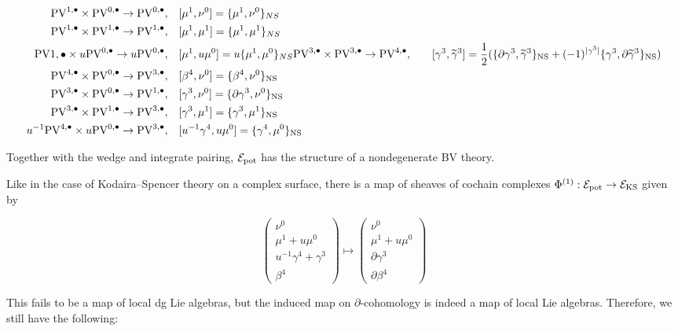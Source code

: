 \documentclass[11pt]{amsart}
\def\PV{{\rm PV}}
\begin{document}
\begin{align}
  \PV^{1,\bu}\times\PV^{0,\bu}\to \PV^{0,\bu},\ \ \ & [\mu^{1},\nu^{0}] = \{\mu^{1},\nu^{0}\}_{NS}\\
  \PV^{1,\bu}\times\PV^{1,\bu}\to\PV^{1,\bu},\ \ \ & [\mu^{1}, \mu^{1}] = \{\mu^{1}, \mu^{1}\}_{NS}\\
  \PV{1,\bu}\times u\PV^{0,\bu}\to u\PV^{0,\bu}, \ \ \ & [\mu^{1}, u\mu^{0}]=u\{\mu^{1},\mu^{0}\}_{NS}
  \PV^{3,\bu}\times \PV^{3,\bu}\to \PV^{4,\bu}, \ \ \ & [\gamma^3, \Tilde{\gamma}^3] = \frac{1}{2}(\{\partial \gamma^3 , \Tilde{\gamma}^{3}\}_{\rm NS} +(-1)^{|\gamma^{3}|} \{\gamma^3, \partial \Tilde{\gamma}^{3}\}_{\rm NS}) \\
  \PV^{4,\bu}\times \PV^{0,\bu}\to \PV^{3,\bu}, \ \ \ & [\beta^{4}, \nu^{0}] = \{\beta^{4}, \nu^{0}\}_{\rm {NS}}\\
  \PV^{3,\bu}\times \PV^{0,\bu}\to \PV^{1,\bu}, \ \ \ & [\gamma^{3}, \nu^{0}] = \{\partial\gamma^{3}, \nu^{0}\}_{\rm NS}\\
  \PV^{3,\bu}\times \PV^{1,\bu}\to \PV^{3,\bu}, \ \ \ & [\gamma^{3}, \mu^{1}] = \{\gamma^{3}, \mu^{1}\}_{\rm NS}\\
  u^{-1}\PV^{4,\bu}\times u\PV^{0,\bu}\to \PV^{3,\bu}, \ \ \ & [u^{-1}\gamma^{4}, u\mu^{0}] = \{\gamma^{4},\mu^{0}\}_{\rm NS}
\end{align}

Together with the wedge and integrate pairing, $\mathcal E_{\rm pot}$ has the structure of a nondegenerate BV theory.

Like in the case of Kodaira--Spencer theory on a complex surface, there is a  map of sheaves of cochain complexes $\Phi^{(1)}: \mathcal E_{\rm pot}\to \mathcal E_{\rm KS}$ given by

\[\begin{pmatrix}\nu^{0} \\ \mu^{1}+u\mu^{0} \\ u^{-1}\gamma^{4}+\gamma^{3} \\ \beta^{4}\end{pmatrix}\mapsto \begin{pmatrix}\nu^{0} \\ \mu^{1}+u\mu^{0} \\ \partial\gamma^{3} \\ \partial\beta^{4}\end{pmatrix}\]

This fails to be a map of local dg Lie algebras, but the induced map on $\partial$-cohomology is indeed a map of local Lie algebras. Therefore, we still have the following:
\end{document}

